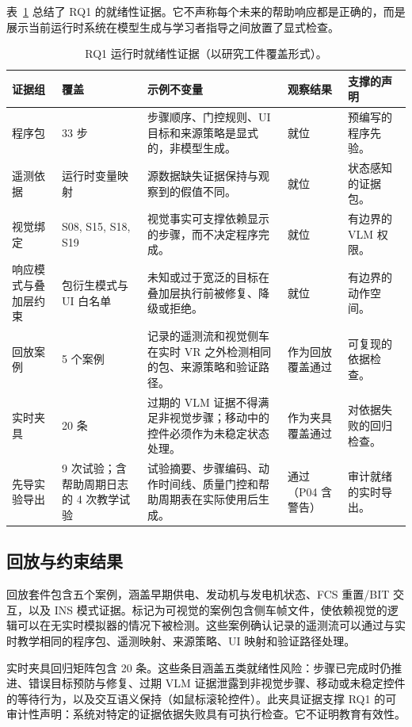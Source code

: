 表~\ref{tab:rq1-readiness} 总结了 RQ1 的就绪性证据。它不声称每个未来的帮助响应都是正确的，而是展示当前运行时系统在模型生成与学习者指导之间放置了显式检查。

\begin{table}[htbp]
\centering
\caption{RQ1 运行时就绪性证据（以研究工件覆盖形式）。}
\label{tab:rq1-readiness}
\footnotesize
\begin{tabularx}{\textwidth}{@{}p{}p{}p{}p{}X@{}}
\toprule
\textbf{证据组} & \textbf{覆盖} & \textbf{示例不变量} & \textbf{观察结果} & \textbf{支撑的声明} \\
\midrule
程序包 & 33 步 & 步骤顺序、门控规则、UI 目标和来源策略是显式的，非模型生成。 & 就位 & 预编写的程序先验。 \\
遥测依据 & 运行时变量映射 & 源数据缺失证据保持与观察到的假值不同。 & 就位 & 状态感知的证据包。 \\
视觉绑定 & S08, S15, S18, S19 & 视觉事实可支撑依赖显示的步骤，而不决定程序完成。 & 就位 & 有边界的 VLM 权限。 \\
响应模式与叠加层约束 & 包衍生模式与 UI 白名单 & 未知或过于宽泛的目标在叠加层执行前被修复、降级或拒绝。 & 就位 & 有边界的动作空间。 \\
回放案例 & 5 个案例 & 记录的遥测流和视觉侧车在实时 VR 之外检测相同的包、来源策略和验证路径。 & 作为回放覆盖通过 & 可复现的依据检查。 \\
实时夹具 & 20 条 & 过期的 VLM 证据不得满足非视觉步骤；移动中的控件必须作为未稳定状态处理。 & 作为夹具覆盖通过 & 对依据失败的回归检查。 \\
先导实验导出 & 9 次试验；含帮助周期日志的 4 次教学试验 & 试验摘要、步骤编码、动作时间线、质量门控和帮助周期表在实际使用后生成。 & 通过（P04 含警告） & 审计就绪的实时导出。 \\
\bottomrule
\end{tabularx}
\end{table}

\subsection{回放与约束结果}

回放套件包含五个案例，涵盖早期供电、发动机与发电机状态、FCS 重置/BIT 交互，以及 INS 模式证据。标记为可视觉的案例包含侧车帧文件，使依赖视觉的逻辑可以在无实时模拟器的情况下被检测。这些案例确认记录的遥测流可以通过与实时教学相同的程序包、遥测映射、来源策略、UI 映射和验证路径处理。

实时夹具回归矩阵包含 20 条。这些条目涵盖五类就绪性风险：步骤已完成时仍推进、错误目标预防与修复、过期 VLM 证据泄露到非视觉步骤、移动或未稳定控件的等待行为，以及交互语义保持（如鼠标滚轮控件）。此夹具证据支撑 RQ1 的可审计性声明：系统对特定的证据依据失败具有可执行检查。它不证明教育有效性。

